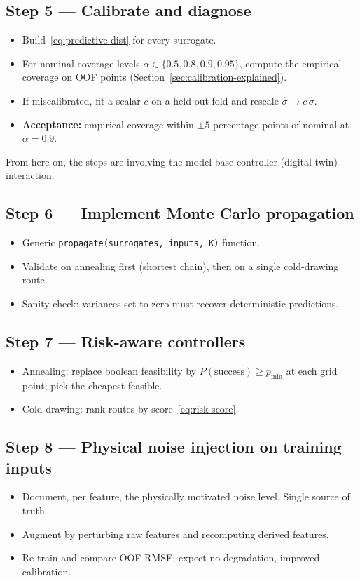 \documentclass[11pt,a4paper]{article}
\begin{document}
\subsection*{Step 5 --- Calibrate and diagnose}
\begin{itemize}
    \item Build~\eqref{eq:predictive-dist} for every surrogate.
    \item For nominal coverage levels $\alpha \in \{0.5, 0.8, 0.9, 0.95\}$, compute the empirical coverage on OOF points (Section~\ref{sec:calibration-explained}).
    \item If miscalibrated, fit a scalar $c$ on a held-out fold and rescale $\hat\sigma \to c \, \hat\sigma$.
    \item \textbf{Acceptance:} empirical coverage within $\pm 5$ percentage points of nominal at $\alpha = 0.9$.
\end{itemize}

From here on, the steps are involving the model base controller (digital twin) interaction.

\subsection*{Step 6 --- Implement Monte Carlo propagation}
\begin{itemize}
    \item Generic \texttt{propagate(surrogates, inputs, K)} function.
    \item Validate on annealing first (shortest chain), then on a single cold-drawing route.
    \item Sanity check: variances set to zero must recover deterministic predictions.
\end{itemize}

\subsection*{Step 7 --- Risk-aware controllers}
\begin{itemize}
    \item Annealing: replace boolean feasibility by $P(\text{success}) \geq p_{\min}$ at each grid point; pick the cheapest feasible.
    \item Cold drawing: rank routes by score~\eqref{eq:risk-score}.
\end{itemize}

\subsection*{Step 8 --- Physical noise injection on training inputs}
\begin{itemize}
    \item Document, per feature, the physically motivated noise level. Single source of truth.
    \item Augment by perturbing raw features and recomputing derived features.
    \item Re-train and compare OOF RMSE; expect no degradation, improved calibration.
\end{itemize}
\end{document}
